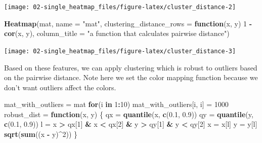 \documentclass[]{book}
\newenvironment{Shaded}{\begin{snugshade}}{\end{snugshade}}
\newcommand{\KeywordTok}[1]{\textcolor[rgb]{0.13,0.29,0.53}{\textbf{#1}}}
\newcommand{\DataTypeTok}[1]{\textcolor[rgb]{0.13,0.29,0.53}{#1}}
\newcommand{\DecValTok}[1]{\textcolor[rgb]{0.00,0.00,0.81}{#1}}
\newcommand{\FloatTok}[1]{\textcolor[rgb]{0.00,0.00,0.81}{#1}}
\newcommand{\StringTok}[1]{\textcolor[rgb]{0.31,0.60,0.02}{#1}}
\newcommand{\ControlFlowTok}[1]{\textcolor[rgb]{0.13,0.29,0.53}{\textbf{#1}}}
\newcommand{\OperatorTok}[1]{\textcolor[rgb]{0.81,0.36,0.00}{\textbf{#1}}}
\newcommand{\NormalTok}[1]{#1}
\theoremstyle{definition}
\theoremstyle{definition}
\theoremstyle{definition}
\theoremstyle{remark}
\begin{document}
\begin{center}\texttt{[image: 02-single\_heatmap\_files/figure-latex/cluster\_distance-2]} \end{center}

\begin{Shaded}
\begin{Highlighting}[]
\KeywordTok{Heatmap}\NormalTok{(mat, }\DataTypeTok{name =} \StringTok{"mat"}\NormalTok{, }\DataTypeTok{clustering_distance_rows =} \ControlFlowTok{function}\NormalTok{(x, y) }\DecValTok{1} \OperatorTok{-}\StringTok{ }\KeywordTok{cor}\NormalTok{(x, y),}
    \DataTypeTok{column_title =} \StringTok{"a function that calculates pairwise distance"}\NormalTok{)}
\end{Highlighting}
\end{Shaded}

\begin{center}\texttt{[image: 02-single\_heatmap\_files/figure-latex/cluster\_distance-3]} \end{center}

Based on these features, we can apply clustering which is robust to
outliers based on the pairwise distance. Note here we set the color
mapping function because we don't want outliers affect the colors.

\begin{Shaded}
\begin{Highlighting}[]
\NormalTok{mat_with_outliers =}\StringTok{ }\NormalTok{mat}
\ControlFlowTok{for}\NormalTok{(i }\ControlFlowTok{in}  \DecValTok{1}\OperatorTok{:}\DecValTok{10}\NormalTok{) mat_with_outliers[i, i] =}\StringTok{ }\DecValTok{1000}
\NormalTok{robust_dist =}\StringTok{ }\ControlFlowTok{function}\NormalTok{(x, y) \{}
\NormalTok{    qx =}\StringTok{ }\KeywordTok{quantile}\NormalTok{(x, }\KeywordTok{c}\NormalTok{(}\FloatTok{0.1}\NormalTok{, }\FloatTok{0.9}\NormalTok{))}
\NormalTok{    qy =}\StringTok{ }\KeywordTok{quantile}\NormalTok{(y, }\KeywordTok{c}\NormalTok{(}\FloatTok{0.1}\NormalTok{, }\FloatTok{0.9}\NormalTok{))}
\NormalTok{    l =}\StringTok{ }\NormalTok{x }\OperatorTok{>}\StringTok{ }\NormalTok{qx[}\DecValTok{1}\NormalTok{] }\OperatorTok{&}\StringTok{ }\NormalTok{x }\OperatorTok{<}\StringTok{ }\NormalTok{qx[}\DecValTok{2}\NormalTok{] }\OperatorTok{&}\StringTok{ }\NormalTok{y }\OperatorTok{>}\StringTok{ }\NormalTok{qy[}\DecValTok{1}\NormalTok{] }\OperatorTok{&}\StringTok{ }\NormalTok{y }\OperatorTok{<}\StringTok{ }\NormalTok{qy[}\DecValTok{2}\NormalTok{]}
\NormalTok{    x =}\StringTok{ }\NormalTok{x[l]}
\NormalTok{    y =}\StringTok{ }\NormalTok{y[l]}
    \KeywordTok{sqrt}\NormalTok{(}\KeywordTok{sum}\NormalTok{((x }\OperatorTok{-}\StringTok{ }\NormalTok{y)}\OperatorTok{^}\DecValTok{2}\NormalTok{))}
\NormalTok{\}}
\end{Highlighting}
\end{Shaded}
\end{document}
